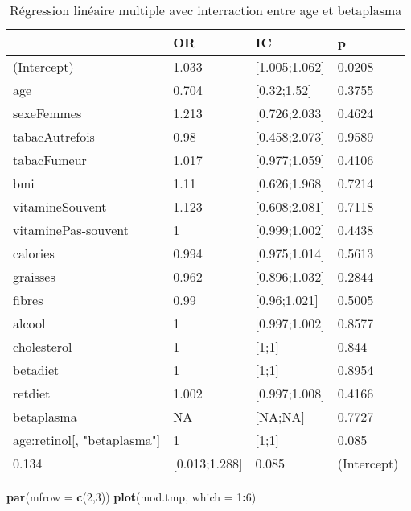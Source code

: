 \documentclass[]{article}
\newenvironment{Shaded}{\begin{snugshade}}{\end{snugshade}}
\newcommand{\KeywordTok}[1]{\textcolor[rgb]{0.13,0.29,0.53}{\textbf{#1}}}
\newcommand{\DataTypeTok}[1]{\textcolor[rgb]{0.13,0.29,0.53}{#1}}
\newcommand{\DecValTok}[1]{\textcolor[rgb]{0.00,0.00,0.81}{#1}}
\newcommand{\OperatorTok}[1]{\textcolor[rgb]{0.81,0.36,0.00}{\textbf{#1}}}
\newcommand{\NormalTok}[1]{#1}
\begin{document}
\begin{table}

\caption{\label{tab:unnamed-chunk-83}Régression linéaire multiple avec interraction entre age et betaplasma}
\centering
\begin{tabular}[t]{l|l|l|l}
\hline
  & OR & IC & p\\
\hline
\rowcolor[HTML]{BBD2E1}  (Intercept) & 1.033 & [1.005;1.062] & 0.0208\\
\hline
age & 0.704 & [0.32;1.52] & 0.3755\\
\hline
\rowcolor[HTML]{BBD2E1}  sexeFemmes & 1.213 & [0.726;2.033] & 0.4624\\
\hline
tabacAutrefois & 0.98 & [0.458;2.073] & 0.9589\\
\hline
\rowcolor[HTML]{BBD2E1}  tabacFumeur & 1.017 & [0.977;1.059] & 0.4106\\
\hline
bmi & 1.11 & [0.626;1.968] & 0.7214\\
\hline
\rowcolor[HTML]{BBD2E1}  vitamineSouvent & 1.123 & [0.608;2.081] & 0.7118\\
\hline
vitaminePas-souvent & 1 & [0.999;1.002] & 0.4438\\
\hline
\rowcolor[HTML]{BBD2E1}  calories & 0.994 & [0.975;1.014] & 0.5613\\
\hline
graisses & 0.962 & [0.896;1.032] & 0.2844\\
\hline
\rowcolor[HTML]{BBD2E1}  fibres & 0.99 & [0.96;1.021] & 0.5005\\
\hline
alcool & 1 & [0.997;1.002] & 0.8577\\
\hline
\rowcolor[HTML]{BBD2E1}  cholesterol & 1 & [1;1] & 0.844\\
\hline
betadiet & 1 & [1;1] & 0.8954\\
\hline
\rowcolor[HTML]{BBD2E1}  retdiet & 1.002 & [0.997;1.008] & 0.4166\\
\hline
betaplasma & NA & [NA;NA] & 0.7727\\
\hline
\rowcolor[HTML]{BBD2E1}  age:retinol[, "betaplasma"] & 1 & [1;1] & 0.085\\
\hline
0.134 & [0.013;1.288] & 0.085 & (Intercept)\\
\hline
\end{tabular}
\end{table}

\begin{Shaded}
\begin{Highlighting}[]
\KeywordTok{par}\NormalTok{(}\DataTypeTok{mfrow =} \KeywordTok{c}\NormalTok{(}\DecValTok{2}\NormalTok{,}\DecValTok{3}\NormalTok{))}
\KeywordTok{plot}\NormalTok{(mod.tmp, }\DataTypeTok{which =} \DecValTok{1}\OperatorTok{:}\DecValTok{6}\NormalTok{)}
\end{Highlighting}
\end{Shaded}
\end{document}
